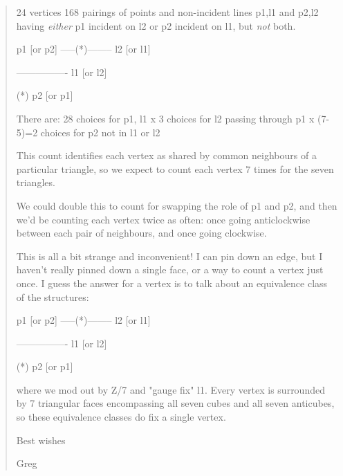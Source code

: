 \begin{quote}
24 vertices               168 pairings of points and non-incident
                          lines {p1,l1} and {p2,l2} having
                          \emph{either} p1 incident on l2 or p2
                          incident on l1, but \emph{not} both.

                               p1 [or p2]
                          -----(*)-------- l2 [or l1]

                          ---------------- l1 [or l2]

                               (*)
                               p2 [or p1]

                          There are:
                          28 choices for {p1, l1}
                        x  3 choices for l2 passing through p1
                        x (7-5)=2 choices for p2 not in l1 or l2

                          This count identifies each vertex
                          as shared by common neighbours of
                          a particular triangle, so we expect
                          to count each vertex 7 times for the
                          seven triangles.

                          We could double this to count for
                          swapping the role of p1 and p2, and then
                          we'd be counting each vertex twice
                          as often:  once going anticlockwise
                          between each pair of neighbours, and
                          once going clockwise.

This is all a bit strange and inconvenient!  I can pin down an edge, but 
I haven't really pinned down a single face, or a way to count a vertex 
just once.  I guess the answer for a vertex is to talk about an 
equivalence class of the structures:


                               p1 [or p2]
                          -----(*)-------- l2 [or l1]

                          ---------------- l1 [or l2]

                               (*)
                               p2 [or p1]

where we mod out by Z/7 and "gauge fix" l1.  Every vertex is surrounded 
by 7 triangular faces encompassing all seven cubes and all seven 
anticubes, so these equivalence classes do fix a single vertex.

Best wishes

Greg
$$
    
\end{quote}



